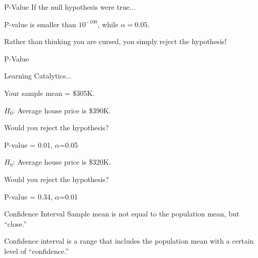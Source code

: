 \documentclass{beamer}\usepackage[]{graphicx}\usepackage[]{color}
\begin{document}
\begin{darkframes}
	
	\begin{frame}[label=lists]{P-Value}
		If the null hypothesis were true... \pause
		\begin{figure} 
				\centering
				\setlength\fboxsep{0pt}
				\setlength\fboxrule{0.2pt} 
		\end{figure} 	\pause		
		P-value is smaller than $10^{-100}$, while $\alpha=0.05$.  \pause
		
		Rather than thinking you are cursed, you simply reject the hypothesis!
	\end{frame}
	
	
	\begin{frame}[label=lists]{P-Value}
			
			Learning Catalytics... \newline \pause
			
			Your sample mean = \$305K. \newline \pause
			
			$H_0$: Average house price is \$390K.
			
			Would you reject the hypothesis? 
			
			P-value = 0.01, $\alpha$=0.05 \newline \pause 
			
			$H_0$: Average house price is \$320K.
			
			Would you reject the hypothesis? 
			
			P-value = 0.34, $\alpha$=0.01 \pause 
			
		
	\end{frame}

	

	
	\begin{frame}[label=lists]{Confidence Interval}
		Sample mean is not equal to the population mean, but ``close.'' \pause
				
		\alert{Confidence interval} is a range that includes the population mean with a certain level of ``confidence.'' \pause
		

\end{frame}
\end{darkframes}
\end{document}
